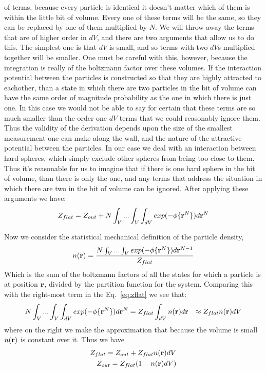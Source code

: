 of terms, because every particle is identical it doesn't matter which
of them is within the little bit of volume.  Every one of these terms
will be the same, so they can be replaced by one of them multiplied by
$N$.  We will throw away the terms that are of higher order in $dV$,
and there are two arguments that allow us to do this.  The simplest
one is that $dV$ is small, and so terms with two $dV$s multiplied
together will be smaller.  One must be careful with this, however,
because the integration is really of the boltzmann factor over these
volumes.  If the interaction potential between the particles is
constructed so that they are highly attracted to eachother, than a
state in which there are two particles in the bit of volume can have
the same order of magnitude probability as the one in which there is
just one.  In this case we would not be able to say for certain that
these terms are so much smaller than the order one $dV$ terms that we
could reasonably ignore them. Thus the validity of the derivation
depends upon the size of the smallest measurement one can make along
the wall, and the nature of the attractive potential between the
particles.  In our case we deal with an interaction between hard
spheres, which simply exclude other spheres from being too close to
them.  Thus it's reasonable for us to imagine that if there is one
hard sphere in the bit of volume, than there is only the one, and any
terms that address the situation in which there are two in the bit of
volume can be ignored.  After applying these arguments we have:
\begin{align}
  \label{eq:zflat}
  Z_{flat} = Z_{out} + N \int_V... \int_V \int_{dV} exp(-\phi \{ \textbf{r}^N \})d\textbf{r}^N
\end{align}

Now we consider the statistical mechanical definition of the particle
density,
\begin{align}
  n(\textbf{r}) = \frac{N \int_V... \int_V exp(-\phi \{ \textbf{r}^N \})d\textbf{r}^{N-1}}{Z_{flat}}
\end{align}
Which is the sum of the boltzmann factors of all the states for which
a particle is at position $\textbf{r}$, divided by the partition function for
the system.  Comparing this with the right-most term in the
Eq.~\ref{eq:zflat} we see that:
\begin{align}
 N \int_V... \int_V \int_{dV} exp(-\phi \{ \textbf{r}^N \})d\textbf{r}^N  &= Z_{flat} \int_{dV} n(\textbf{r}) d\textbf{r}
 &\approx Z_{flat} n(\textbf{r})dV
\end{align}
where on the right we make the approximation that because the volume
is small $n(\textbf{r})$ is constant over it.
Thus we have
\begin{align}
Z_{flat} = Z_{out} + Z_{flat} n(\textbf{r})dV \\
Z_{out} = Z_{flat} (1-n(\textbf{r})dV)
\end{align}

